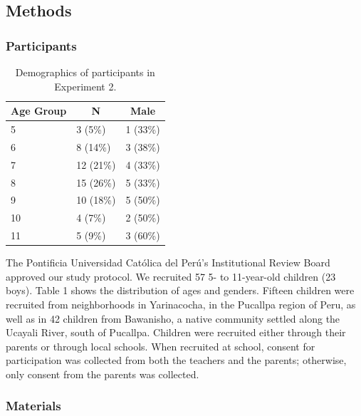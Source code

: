 \documentclass[,man,floatsintext]{apa6}
\theoremstyle{definition}
\theoremstyle{definition}
\theoremstyle{definition}
\theoremstyle{remark}
\begin{document}
\subsection{Methods}\label{methods-1}

\subsubsection{Participants}\label{participants-1}

\begin{table}[tbp]
\begin{center}
\begin{threeparttable}
\caption{\label{tab:unnamed-chunk-2}Demographics of participants in Experiment 2.}
\begin{tabular}{lll}
\toprule
Age Group & \multicolumn{1}{c}{N} & \multicolumn{1}{c}{Male}\\
\midrule
5 & 3 (5\%) & 1 (33\%)\\
6 & 8 (14\%) & 3 (38\%)\\
7 & 12 (21\%) & 4 (33\%)\\
8 & 15 (26\%) & 5 (33\%)\\
9 & 10 (18\%) & 5 (50\%)\\
10 & 4 (7\%) & 2 (50\%)\\
11 & 5 (9\%) & 3 (60\%)\\
\bottomrule
\end{tabular}
\end{threeparttable}
\end{center}
\end{table}

The Pontificia Universidad Católica del Perú's Institutional Review
Board approved our study protocol. We recruited 57 5- to 11-year-old
children (23 boys). Table 1 shows the distribution of ages and genders.
Fifteen children were recruited from neighborhoods in Yarinacocha, in
the Pucallpa region of Peru, as well as in 42 children from Bawanisho, a
native community settled along the Ucayali River, south of Pucallpa.
Children were recruited either through their parents or through local
schools. When recruited at school, consent for participation was
collected from both the teachers and the parents; otherwise, only
consent from the parents was collected.

\subsubsection{Materials}\label{materials-1}
\end{document}

